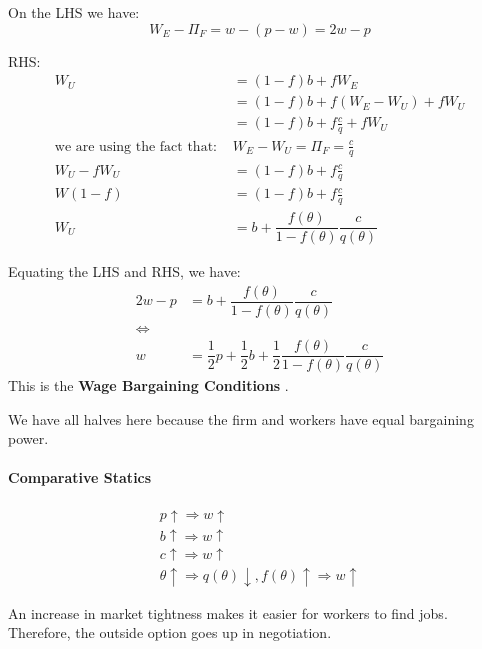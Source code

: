 \documentclass[11pt]{article}
\begin{document}
\begin{deriv}
    On the LHS we have:
   \begin{equation}
W_E-\Pi_F=w-(p-w)=2 w-p
\end{equation}

RHS:
\begin{equation}
\begin{aligned}
W_U & =(1-f) b+f W_E \\
& =(1-f) b+f\left(W_E-W_U\right)+f W_U \\
& =(1-f) b+f \frac{c}{q}+f W_U \\
\text{we are using the fact that: } &W_E - W_U = \Pi_F = \frac{c}{q} \\
W_U - fW_U &= (1-f)b + f\frac{c}{q} \\
W(1-f) &= (1-f)b + f\frac{c}{q} \\
W_U &= b + \dfrac{f(\theta)}{1-f(\theta)}\dfrac{c}{q(\theta)}
\end{aligned}
\end{equation}

Equating the LHS and RHS, we have:
\begin{align*}
    2w-p &= b + \dfrac{f(\theta)}{1-f(\theta)}\dfrac{c}{q(\theta)} \\
    \Leftrightarrow& \\
    w&= \dfrac{1}{2}p + \dfrac{1}{2}b + \dfrac{1}{2}\dfrac{f(\theta)}{1-f(\theta)}\dfrac{c}{q(\theta)}
\end{align*}
This is the \textbf{Wage Bargaining Conditions}
.\begin{note}
    We have all halves here because the firm and workers have equal bargaining power.
\end{note}
\end{deriv}

\newpage
\begin{shaded}
    \paragraph{Comparative Statics} \mbox{}

    \begin{gather*}
        p\uparrow\Rightarrow w\uparrow \\
        b\uparrow \Rightarrow w\uparrow \\
        c\uparrow\Rightarrow w \uparrow \\
        \theta\uparrow \Rightarrow q(\theta)\downarrow, f(\theta)\uparrow \Rightarrow w\uparrow
    \end{gather*}

    An increase in market tightness makes it easier for workers to find jobs. Therefore, the outside option goes up in negotiation.
\end{shaded}
\end{document}
